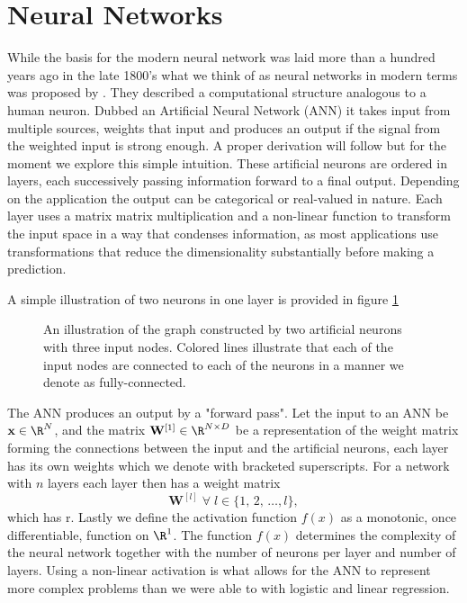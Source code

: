 
\section{Neural Networks}\label{sec:ANN}

While the basis for the modern neural network was laid more than a hundred years ago in the late 1800's what we think of as neural networks in modern terms was proposed by \citet{McCulloch1943}. They described a computational structure analogous to a human neuron. Dubbed an Artificial Neural Network (ANN) it takes input from multiple sources, weights that input and produces an output if the signal from the weighted input is strong enough. A proper derivation will follow but for the moment we explore this simple intuition. These artificial neurons are ordered in layers, each successively passing information forward to a final output. Depending on the application the output can be categorical or real-valued in nature. Each layer uses a matrix matrix multiplication and a non-linear function to transform the input space in a way that condenses information, as most applications use transformations that reduce the dimensionality substantially before making a prediction.

A simple illustration of two neurons in one layer is provided in figure \ref{fig:ann_illustration} 



\begin{figure}[h]
\centering

\caption[Fully connected neural network illustration]{An illustration of the graph constructed by two artificial neurons with three input nodes. Colored lines illustrate that  each of the input nodes are connected to each of the neurons in a manner we denote as fully-connected.}\label{fig:ann_illustration}
\end{figure}


\noindent The ANN produces an output by a "forward pass". Let the input to an ANN be $\mathbf{x} \in \R^N$, and the matrix $\mathbf{W}^{[1]} \in \R^{N \times D}$ be a representation of the weight matrix forming the connections between the input and the artificial neurons, each layer has its own weights which we denote with bracketed superscripts. For a network with $n$ layers each layer then has a weight matrix $$\mathbf{W}^{[l]} \; \forall \; l \in \{1,\, 2,\, \dots, l\},$$ 
\noindent which has r.  Lastly we define the activation function $f(x)$ as a monotonic, once differentiable, function on $\R^1$. The function $f(x)$ determines the complexity of the neural network together with the number of neurons per layer and number of layers. Using a non-linear activation is what allows for the ANN to represent more complex problems than we were able to with logistic and linear regression.

